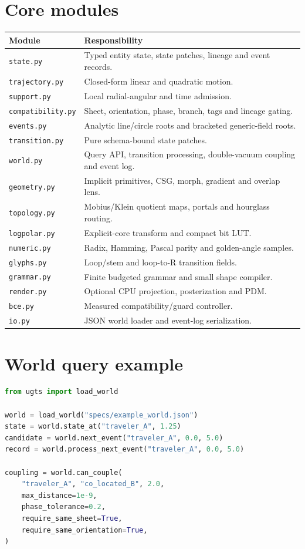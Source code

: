 \documentclass[10.5pt,a4paper,openany]{book}
\newcommand{\code}[1]{\texttt{#1}}
\begin{document}
\section{Core modules}
\begin{longtable}{@{}p{}p{}@{}}
\toprule Module & Responsibility \\ \midrule\endhead
\code{state.py} & Typed entity state, state patches, lineage and event records.\\
\code{trajectory.py} & Closed-form linear and quadratic motion.\\
\code{support.py} & Local radial-angular and time admission.\\
\code{compatibility.py} & Sheet, orientation, phase, branch, tags and lineage gating.\\
\code{events.py} & Analytic line/circle roots and bracketed generic-field roots.\\
\code{transition.py} & Pure schema-bound state patches.\\
\code{world.py} & Query API, transition processing, double-vacuum coupling and event log.\\
\code{geometry.py} & Implicit primitives, CSG, morph, gradient and overlap lens.\\
\code{topology.py} & Mobius/Klein quotient maps, portals and hourglass routing.\\
\code{logpolar.py} & Explicit-core transform and compact bit LUT.\\
\code{numeric.py} & Radix, Hamming, Pascal parity and golden-angle samples.\\
\code{glyphs.py} & Loop/stem and loop-to-R transition fields.\\
\code{grammar.py} & Finite budgeted grammar and small shape compiler.\\
\code{render.py} & Optional CPU projection, posterization and PDM.\\
\code{bce.py} & Measured compatibility/guard controller.\\
\code{io.py} & JSON world loader and event-log serialization.\\
\bottomrule
\end{longtable}

\section{World query example}
\begin{lstlisting}[language=Python,caption={Minimal query-first use}]
from ugts import load_world

world = load_world("specs/example_world.json")
state = world.state_at("traveler_A", 1.25)
candidate = world.next_event("traveler_A", 0.0, 5.0)
record = world.process_next_event("traveler_A", 0.0, 5.0)

coupling = world.can_couple(
    "traveler_A", "co_located_B", 2.0,
    max_distance=1e-9,
    phase_tolerance=0.2,
    require_same_sheet=True,
    require_same_orientation=True,
)
\end{lstlisting}
\end{document}

